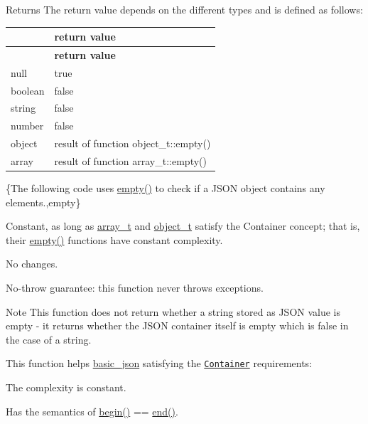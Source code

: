 \begin{DoxyReturn}{Returns}
The return value depends on the different types and is defined as follows\+: \tabulinesep=1mm
\begin{longtabu} spread 0pt [c]{*2{|X[-1]}|}
\hline
{}&{\bf return value  }\\
\endfirsthead
\hline
\endfoot
\hline
{}&{\bf return value  }\\
\endhead
null &{\ttfamily true} \\
boolean &{\ttfamily false} \\
string &{\ttfamily false} \\
number &{\ttfamily false} \\
object &result of function {\ttfamily object\+\_\+t\+::empty()} \\
array &result of function {\ttfamily array\+\_\+t\+::empty()} \\
\end{longtabu}
\{The following code uses {\ttfamily \hyperlink{classnlohmann_1_1basic__json_a1a86d444bfeaa9518d2421aedd74444a}{empty()}} to check if a J\+S\+ON object contains any elements.,empty\}
\end{DoxyReturn}
Constant, as long as \hyperlink{classnlohmann_1_1basic__json_a4c409f1b6d9caf3412c78af9a5883fed}{array\+\_\+t} and \hyperlink{classnlohmann_1_1basic__json_a0322396ca5cd4623bc816bf735377623}{object\+\_\+t} satisfy the Container concept; that is, their {\ttfamily \hyperlink{classnlohmann_1_1basic__json_a1a86d444bfeaa9518d2421aedd74444a}{empty()}} functions have constant complexity.

No changes.

No-\/throw guarantee\+: this function never throws exceptions.

\begin{DoxyNote}{Note}
This function does not return whether a string stored as J\+S\+ON value is empty -\/ it returns whether the J\+S\+ON container itself is empty which is false in the case of a string.
\end{DoxyNote}
This function helps {\ttfamily \hyperlink{classnlohmann_1_1basic__json}{basic\+\_\+json}} satisfying the \href{https://en.cppreference.com/w/cpp/named_req/Container}{\tt Container} requirements\+:
\begin{DoxyItemize}
\item The complexity is constant.
\item Has the semantics of {\ttfamily \hyperlink{classnlohmann_1_1basic__json_a0ff28dac23f2bdecee9564d07f51dcdc}{begin()} == \hyperlink{classnlohmann_1_1basic__json_a13e032a02a7fd8a93fdddc2fcbc4763c}{end()}}.
\end{DoxyItemize}

